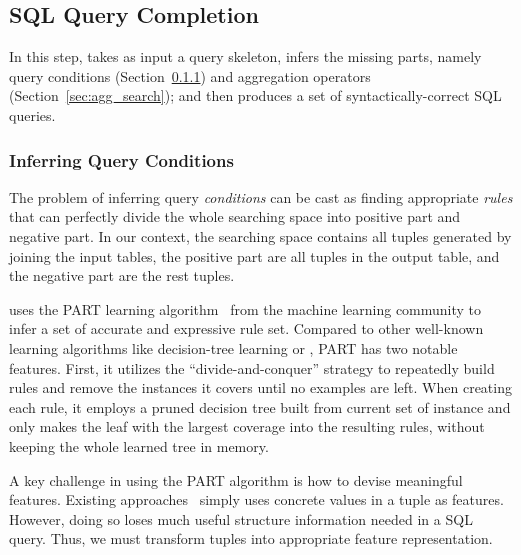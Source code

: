 \subsection{SQL Query Completion}
\label{sec:completion}

In this step, \ourtool takes as input a query skeleton, infers
the missing parts, namely
query conditions (Section~\ref{sec:condition}) and
aggregation operators (Section~\ref{sec:agg_search}); and then produces a
set of syntactically-correct SQL queries.


\subsubsection{Inferring Query Conditions}
\label{sec:condition}

The problem of inferring query \textit{conditions} can be cast as finding
appropriate \textit{rules} that can perfectly divide the whole searching space
into positive part and negative part. In our context, the searching space
contains all tuples generated by joining the input tables, the positive part
are all tuples in the output table, and the negative part are the rest
tuples.

\ourtool uses the PART learning algorithm~\cite{Frank:1998} from
the machine learning community to infer a set of accurate and
expressive rule set. Compared to other well-known learning algorithms
like decision-tree learning or , PART has two
notable features. 
First, it utilizes the ``divide-and-conquer'' strategy to repeatedly
build rules and remove the instances it covers until no examples are left.
When creating each rule, it employs a pruned decision tree built from
current set of instance and only makes the leaf with the largest coverage
into the resulting rules, without keeping the whole learned tree in memory.

A key challenge in using the PART algorithm is how to devise meaningful
features. Existing approaches~\cite{} simply uses concrete values in a tuple
as features. However, doing so loses much useful structure information
needed in a SQL query.
Thus, we must transform tuples into appropriate feature representation.

